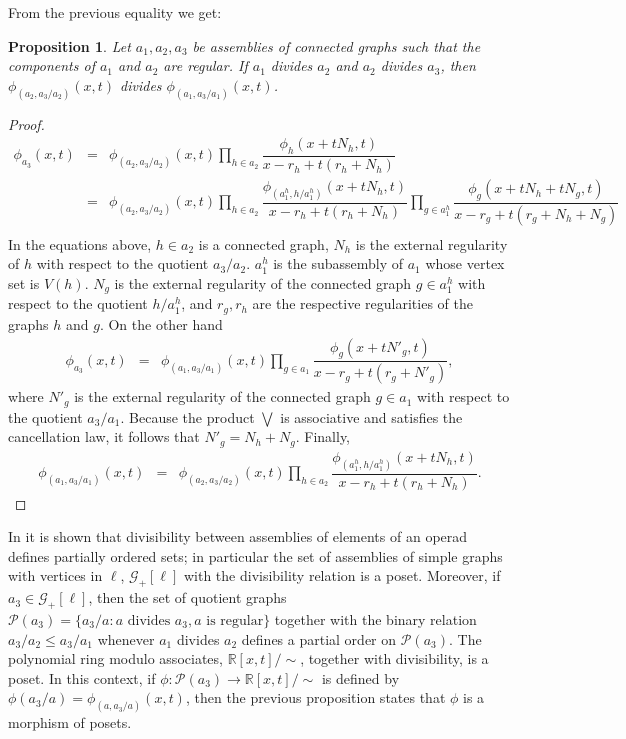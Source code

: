 \documentclass[11pt]{article}
\newtheorem{proposition}[theorem]{Proposition}
\theoremstyle{definition}
\begin{document}
From the previous equality we get:
\begin{proposition}
Let $a_1, a_2, a_3$ be assemblies of connected graphs such that the components of $a_1$ and $a_2$ are regular. If $a_1$ divides $a_2$ and $a_2$ divides $a_3$, then
    $\phi_{(a_2, a_3/a_2)}(x,t)$ divides $\phi_{(a_1, a_3/a_1)}(x,t)$.
\end{proposition}
\begin{proof}
   \begin{eqnarray*}
        \phi_{a_3}(x,t)&=&\phi_{(a_2, a_3/a_2)}(x, t)\prod_{h\in a_2}\dfrac{\phi_h(x+tN_h,t)}{x-r_h+t(r_h+N_h)}\\
        &=&\phi_{(a_2, a_3/a_2)}(x, t)\prod_{h\in a_2}\dfrac{\phi_{(a^h_1, h/a^h_1)}(x+tN_h,t)}{x-r_h+t(r_h+N_h)}\prod_{g\in a^h_1}\dfrac{\phi_g(x+tN_h+tN_g,t)}{x-r_g+t(r_g+N_h+N_g)}\\
\end{eqnarray*}
In the equations above, $h\in a_2$ is a connected graph, $N_h$ is the external regularity of $h$ with respect to the quotient $a_3/a_2$. $a^h_1$ is the subassembly of $a_1$ whose vertex set is $V(h)$. $N_g$ is the external regularity of the connected graph $g\in a^h_1$ with respect to the quotient $h/a^h_1$, and $r_g, r_h$ are the respective regularities of the graphs $h$ and $g$. On the other hand
\begin{eqnarray*}
    \phi_{a_3}(x,t)&=&\phi_{(a_1, a_3/a_1)}(x, t)\prod_{g\in a_1}\dfrac{\phi_g(x+tN'_g,t)}{x-r_g+t(r_g+N'_g)},
\end{eqnarray*}
where $N'_g$ is the external regularity of the connected graph $g\in a_1$ with respect to the quotient $a_3/a_1$. Because the product $\bigvee$ is associative and satisfies the cancellation law, it follows that $N'_g=N_h+N_g$. Finally,
\begin{eqnarray*}
    \phi_{(a_1, a_3/a_1)}(x, t)&=&\phi_{(a_2, a_3/a_2)}(x, t)\prod_{h\in a_2} \dfrac{\phi_{(a^h_1, h/a^h_1)}(x+tN_h,t)}{x-r_h+t(r_h+N_h)}.
\end{eqnarray*}
\end{proof}
In \cite{LibroMiguel2015} it is shown that divisibility between assemblies of elements of an operad defines partially ordered sets; in particular the set of assemblies of simple graphs with vertices in $\ell$, $\mathscr{G}_+[\ell]$ with the divisibility relation is a poset. Moreover, if $a_3\in \mathscr{G}_+[\ell]$, then the set of quotient graphs $\mathcal{P}(a_3)=\{a_3/a : a \text{ divides } a_3, a \text{ is regular}\}$ together with the binary relation
$a_3/a_2 \leq a_3/a_1$ whenever $a_1$ divides $a_2$ defines a partial order on $\mathcal{P}(a_3)$. The polynomial ring modulo associates, $\mathbb{R}[x,t]/\sim$, together with divisibility, is a poset. In this context, if $\phi: \mathcal{P}(a_3)\longrightarrow \mathbb{R}[x,t]/\sim$ is defined by $\phi(a_3/a)=\phi_{(a, a_3/a)}(x,t)$, then the previous proposition states that $\phi$ is a morphism of posets.
\end{document}
